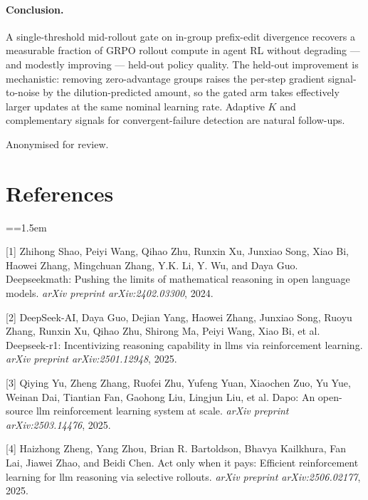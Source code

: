 \documentclass{article}
\begin{document}
\paragraph{Conclusion.}
A single-threshold mid-rollout gate on in-group prefix-edit
divergence recovers a measurable fraction of GRPO rollout
compute in agent RL without degrading --- and modestly
improving --- held-out policy quality. The held-out improvement
is mechanistic: removing zero-advantage groups raises the
per-step gradient signal-to-noise by the dilution-predicted
amount, so the gated arm takes effectively larger updates at
the same nominal learning rate. Adaptive $K$ and complementary signals
for convergent-failure detection are natural follow-ups.



\begin{ack}
Anonymised for review.
\end{ack}

\newpage

\section*{References}

\medskip

\begingroup
\setlength{\parindent}{0pt}
\setlength{\parskip}{4pt plus 1pt}
\everypar={\hangindent=1.5em}

[1] Zhihong Shao, Peiyi Wang, Qihao Zhu, Runxin Xu, Junxiao Song,
Xiao Bi, Haowei Zhang, Mingchuan Zhang, Y.K. Li, Y. Wu, and Daya
Guo. Deepseekmath: Pushing the limits of mathematical reasoning
in open language models. \textit{arXiv preprint arXiv:2402.03300},
2024.

[2] DeepSeek-AI, Daya Guo, Dejian Yang, Haowei Zhang, Junxiao
Song, Ruoyu Zhang, Runxin Xu, Qihao Zhu, Shirong Ma, Peiyi Wang,
Xiao Bi, et al. Deepseek-r1: Incentivizing reasoning capability
in llms via reinforcement learning.
\textit{arXiv preprint arXiv:2501.12948}, 2025.

[3] Qiying Yu, Zheng Zhang, Ruofei Zhu, Yufeng Yuan, Xiaochen
Zuo, Yu Yue, Weinan Dai, Tiantian Fan, Gaohong Liu, Lingjun Liu,
et al. Dapo: An open-source llm reinforcement learning system at
scale. \textit{arXiv preprint arXiv:2503.14476}, 2025.

[4] Haizhong Zheng, Yang Zhou, Brian R. Bartoldson, Bhavya
Kailkhura, Fan Lai, Jiawei Zhao, and Beidi Chen. Act only when it
pays: Efficient reinforcement learning for llm reasoning via
selective rollouts. \textit{arXiv preprint arXiv:2506.02177},
2025.
\end{document}
